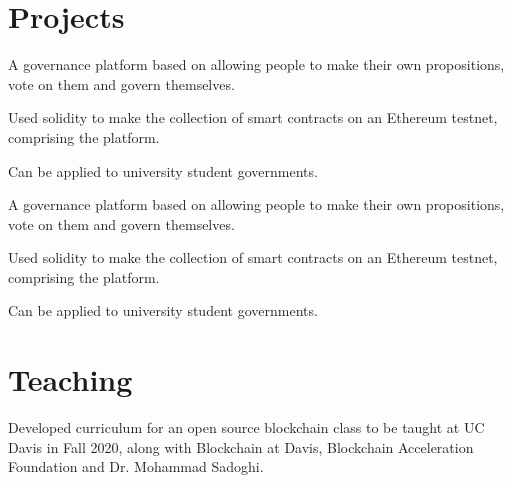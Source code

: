 \documentclass[]{resume-openfont}
\begin{document}
\begin{minipage}[t]{0.66\textwidth}

\section{Projects}


\descript{}
\begin{tightemize}
\item A governance platform based on allowing people to make their own propositions, vote on them  and govern themselves.
\item Used solidity to make the collection of smart contracts on an Ethereum testnet, comprising the platform.
\item Can be applied to university student governments.
\end{tightemize}
\sectionsep

\descript{}
\begin{tightemize}
\item A governance platform based on allowing people to make their own propositions, vote on them  and govern themselves.
\item Used solidity to make the collection of smart contracts on an Ethereum testnet, comprising the platform.
\item Can be applied to university student governments.
\end{tightemize}
\sectionsep

\sectionsep


\section{Teaching}
\descript{}
Developed curriculum for an open source blockchain class to be taught at UC Davis in Fall 2020, along with Blockchain at Davis, Blockchain Acceleration Foundation and Dr. Mohammad Sadoghi.
\sectionsep
\sectionsep


\end{minipage} 
\end{document}
